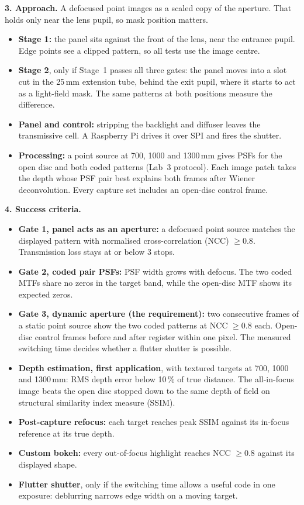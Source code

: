 \vspace{0.4em}
\noindent\textbf{3. Approach.}
A defocused point images as a scaled copy of the aperture. That holds only near the lens pupil, so mask position matters.
\begin{itemize}\setlength\itemsep{0pt}
    \item \textbf{Stage 1:} the panel sits against the front of the lens, near the entrance pupil. Edge points see a clipped pattern, so all tests use the image centre.
    \item \textbf{Stage 2}, only if Stage~1 passes all three gates: the panel moves into a slot cut in the 25\,mm extension tube, behind the exit pupil, where it starts to act as a light-field mask. The same patterns at both positions measure the difference.
    \item \textbf{Panel and control:} stripping the backlight and diffuser leaves the transmissive cell. A Raspberry Pi drives it over SPI and fires the shutter.
    \item \textbf{Processing:} a point source at 700, 1000 and 1300\,mm gives PSFs for the open disc and both coded patterns (Lab~3 protocol). Each image patch takes the depth whose PSF pair best explains both frames after Wiener deconvolution. Every capture set includes an open-disc control frame.
\end{itemize}

\noindent\textbf{4. Success criteria.}
\begin{itemize}\setlength\itemsep{0pt}
    \item \textbf{Gate 1, panel acts as an aperture:} a defocused point source matches the displayed pattern with normalised cross-correlation (NCC) $\geq 0.8$. Transmission loss stays at or below 3 stops.
    \item \textbf{Gate 2, coded pair PSFs:} PSF width grows with defocus. The two coded MTFs share no zeros in the target band, while the open-disc MTF shows its expected zeros.
    \item \textbf{Gate 3, dynamic aperture (the requirement):} two consecutive frames of a static point source show the two coded patterns at NCC $\geq 0.8$ each. Open-disc control frames before and after register within one pixel. The measured switching time decides whether a flutter shutter is possible.
    \item \textbf{Depth estimation, first application}, with textured targets at 700, 1000 and 1300\,mm: RMS depth error below 10\,\% of true distance. The all-in-focus image beats the open disc stopped down to the same depth of field on structural similarity index measure (SSIM).
    \item \textbf{Post-capture refocus:} each target reaches peak SSIM against its in-focus reference at its true depth.
    \item \textbf{Custom bokeh:} every out-of-focus highlight reaches NCC $\geq 0.8$ against its displayed shape.
    \item \textbf{Flutter shutter}, only if the switching time allows a useful code in one exposure: deblurring narrows edge width on a moving target.
\end{itemize}


